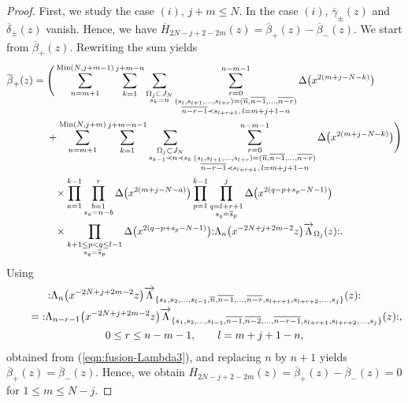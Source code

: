 \documentclass[10pt,a4paper]{amsart}
\numberwithin{equation}{section}
\begin{document}
\begin{proof}
First, we study the case $(i)$, $j+m \leq N$.
In the case $(i)$, $\overline{\gamma}_\pm(z)$ and
$\overline{\delta}_\pm(z)$ vanish. Hence, we have
$\overline{H}_{2N-j+2-2m}(z)=\overline{\beta}_+(z)-\overline{\beta}_-(z)$.
We start from $\overline{\beta}_+(z)$. Rewriting the sum yields
\begin{align}
\overline{\beta}_+(z)={}&
\Bigg(\sum_{n=m+1}^{\operatorname{Min}(N, j+m-1)}
\sum_{k=1}^{j+m-n}\sum\limits_{\substack{\Omega_j \subset J_N\\s_k=n}}
\sum\limits_{\substack{r=0\\(s_l,s_{l+1},\dots,s_{l+r})=
(\overline{n}, \overline{n-1},\dots,\overline{n-r})
\\ \overline{n-r-1}\prec s_{l+r+1},\, l=m+j+1-n}}^{n-m-1}\Delta\big(x^{2(m+j-N-k)}\big)\notag
\\
&+\sum_{n=m+1}^{\operatorname{Min}(N, j+m)}\sum_{k=1}^{j+m-n-1}
\sum\limits_{\substack{\Omega_j \subset J_N\\s_{k-1}\prec n \prec s_k}}
\sum\limits_{\substack{r=0\\(s_l,s_{l+1},\dots,s_{l+r})=
(\overline{n}, \overline{n-1},\dots,\overline{n-r})
\\ \overline{n-r-1}\prec s_{l+r+1},\, l=m+j+1-n}}^{n-m-1}
\Delta\big(x^{2(m+j-N-k)}\big)\Bigg)\notag
\\
&\phantom{+}\times\prod_{a=1}^{k-1}\prod\limits_{\substack{b=1
\\s_a=n-b}}^r \Delta\big(x^{2(m+j-N-a)}\big)
\prod_{p=1}^{k-1}\prod\limits_{\substack{q=l+r+1
\\s_q=\overline{s}_p}}^j\Delta\big(x^{2(q-p+s_p-N-1)}\big)
\notag
\\
&\phantom{+}\times\prod\limits_{\substack{k+1 \leq p<q \leq l-1\\s_q=\overline{s}_p}}
\Delta\big(x^{2(q-p+s_p-N-1)}\big)
{:}\Lambda_n\big(x^{-2N+j+2m-2}z\big)\overrightarrow{\Lambda}_{\Omega_j}(z){:}.
\label{eqn:bbeta+}
\end{align}
Using
\begin{gather}
{:}\Lambda_n\big(x^{-2N+j+2m-2}z\big)\overrightarrow{\Lambda}_{\{s_1,s_2, \dots, s_{l-1}, \overline{n}, \overline{n-1}, \dots, \overline{n-r}, s_{l+r+1}, s_{l+r+2},\dots, s_j\}}(z){:}\notag
\\ \qquad
{}={:}\Lambda_{n-r-1}\big(x^{-2N+j+2m-2}z\big)\overrightarrow{\Lambda}_{\{s_1,s_2, \dots, s_{l-1}, \overline{n-1}, \overline{n-2}, \dots, \overline{n-r-1}, s_{l+r+1}, s_{l+r+2},
\dots, s_j\}}(z){:},\notag
\\
0\leq r \leq n-m-1,\qquad l=m+j+1-n,
\label{eqn:subscript1}
\end{gather}
obtained from (\ref{eqn:fusion-Lambda3}), and replacing $n$ by $n+1$
yields $\overline{\beta}_+(z)=\overline{\beta}_-(z)$. Hence, we obtain
$\overline{H}_{2N-j+2-2m}(z)=\overline{\beta}_+(z)-\overline{\beta}_-(z)=0$
for $1\leq m \leq N-j$.


\end{proof}
\end{document}
